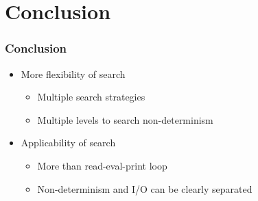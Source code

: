 \documentclass[
,hyperref={pdfpagelabels=false}
]{beamer}
\begin{document}

\section{Conclusion}

\begin{frame}[fragile]%
\frametitle{Conclusion}

\begin{itemize}
\item More flexibility of search
      \begin{itemize}
        \item Multiple search strategies
        \item Multiple levels to search non-determinism
      \end{itemize}
\item Applicability of search
      \begin{itemize}
        \item More than read-eval-print loop
        \item Non-determinism and I/O can be clearly separated
      \end{itemize}
\end{itemize}
\end{frame}
\end{document}
